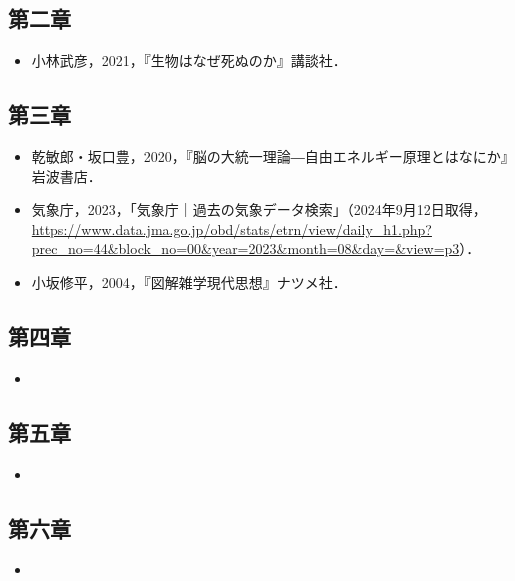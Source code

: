 \subsection{第二章}\label{ux7b2cux4e8cux7ae0}

\begin{itemize}
\tightlist
\item
  小林武彦，2021，『生物はなぜ死ぬのか』講談社．
\end{itemize}

\subsection{第三章}\label{ux7b2cux4e09ux7ae0}

\begin{itemize}
\tightlist
\item
  乾敏郎・坂口豊，2020，『脳の大統一理論―自由エネルギー原理とはなにか』岩波書店．
\item
  気象庁，2023，「気象庁｜過去の気象データ検索」（2024年9月12日取得，\url{https://www.data.jma.go.jp/obd/stats/etrn/view/daily_h1.php?prec_no=44&block_no=00&year=2023&month=08&day=&view=p3}）．
\item
  小坂修平，2004，『図解雑学現代思想』ナツメ社．
\end{itemize}

\subsection{第四章}\label{ux7b2cux56dbux7ae0}

\begin{itemize}
\tightlist
\item
\end{itemize}

\subsection{第五章}\label{ux7b2cux4e94ux7ae0}

\begin{itemize}
\tightlist
\item
\end{itemize}

\subsection{第六章}\label{ux7b2cux516dux7ae0}

\begin{itemize}
\tightlist
\item
\end{itemize}

